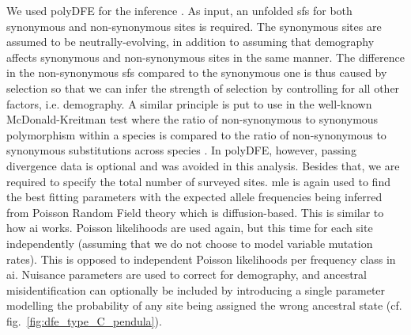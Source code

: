 \documentclass[hidelinks,11pt]{article}
\newcommand{\dadi}{\textdelta a\textdelta i}
\begin{document}
    We used polyDFE for the inference \cite{polydfe}. As input, an unfolded \acrshort{sfs} for both synonymous and non-synonymous sites is required. The synonymous sites are assumed to be neutrally-evolving, in addition to assuming that demography affects synonymous and non-synonymous sites in the same manner. The difference in the non-synonymous \acrshort{sfs} compared to the synonymous one is thus caused by selection so that we can infer the strength of selection by controlling for all other factors, i.e. demography. A similar principle is put to use in the well-known McDonald-Kreitman test where the ratio of non-synonymous to synonymous polymorphism within a species is compared to the ratio of non-synonymous to synonymous substitutions across species \cite{mk-test}. In polyDFE, however, passing divergence data is optional and was avoided in this analysis. Besides that, we are required to specify the total number of surveyed sites. \acrfull{mle} is again used to find the best fitting parameters with the expected allele frequencies being inferred from Poisson Random Field theory which is diffusion-based. This is similar to how \dadi{} works. Poisson likelihoods are used again, but this time for each site independently (assuming that we do not choose to model variable mutation rates). This is opposed to independent Poisson likelihoods per frequency class in \dadi{}. Nuisance parameters are used to correct for demography, and ancestral misidentification can optionally be included by introducing a single parameter modelling the probability of any site being assigned the wrong ancestral state (cf. fig.~\ref{fig:dfe_type_C_pendula}).
\end{document}
